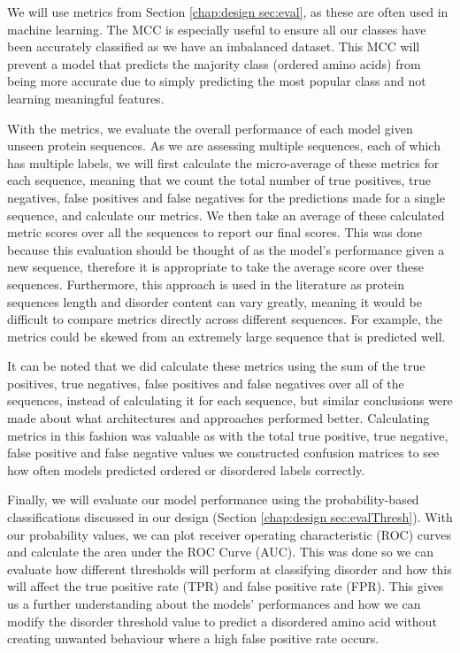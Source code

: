 \documentclass{l4proj}
\begin{document}
We will use metrics from Section \ref{chap:design sec:eval}, as these are often used in machine learning. The MCC is especially useful to ensure all our classes have been accurately classified as we have an imbalanced dataset. This MCC will prevent a model that predicts the majority class (ordered amino acids) from being more accurate due to simply predicting the most popular class and not learning meaningful features.

With the metrics, we evaluate the overall performance of each model given unseen protein sequences. As we are assessing multiple sequences, each of which has multiple labels, we will first calculate the micro-average of these metrics for each sequence, meaning that we count the total number of true positives, true negatives, false positives and false negatives for the predictions made for a single sequence, and calculate our metrics. We then take an average of these calculated metric scores over all the sequences to report our final scores. This was done because this evaluation should be thought of as the model's performance given a new sequence, therefore it is appropriate to take the average score over these sequences. Furthermore, this approach is used in the literature as protein sequences length and disorder content can vary greatly, meaning it would be difficult to compare metrics directly across different sequences. For example, the metrics could be skewed from an extremely large sequence that is predicted well.

It can be noted that we did calculate these metrics using the sum of the true positives, true negatives, false positives and false negatives over all of the sequences, instead of calculating it for each sequence, but similar conclusions were made about what architectures and approaches performed better. Calculating metrics in this fashion was valuable as with the total true positive, true negative, false positive and false negative values we constructed confusion matrices to see how often models predicted ordered or disordered labels correctly.

Finally, we will evaluate our model performance using the probability-based classifications discussed in our design (Section \ref{chap:design sec:evalThresh}). With our probability values, we can plot receiver operating characteristic (ROC) curves and calculate the area under the ROC Curve (AUC). This was done so we can evaluate how different thresholds will perform at classifying disorder and how this will affect the true positive rate (TPR) and false positive rate (FPR). This gives us a further understanding about the models’ performances and how we can modify the disorder threshold value to predict a disordered amino acid without creating unwanted behaviour where a high false positive rate occurs.
\end{document}
